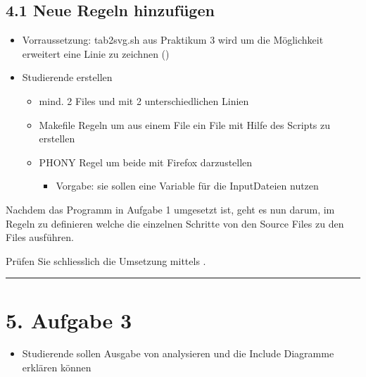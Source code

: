 \documentclass[a4paper,10pt,english]{report}
\begin{document}
\subsection{4.1 Neue Regeln hinzufügen}
\label{\detokenize{P04_Modularisieren_von_C_Code/new_P04/P04_Modularisieren_von_C_Code:neue-regeln-hinzufugen}}\begin{itemize}
\item {} 
\sphinxAtStartPar
Vorraussetzung: tab2svg.sh aus Praktikum 3 wird um die Möglichkeit erweitert eine Linie zu zeichnen ()

\item {} 
\sphinxAtStartPar
Studierende erstellen
\begin{itemize}
\item {} 
\sphinxAtStartPar
mind. 2 Files  und  mit 2 unterschiedlichen Linien

\item {} 
\sphinxAtStartPar
Makefile Regeln um aus einem File  ein File  mit Hilfe des Scripts zu erstellen

\item {} 
\sphinxAtStartPar
PHONY Regel  um beide  mit Firefox darzustellen
\begin{itemize}
\item {} 
\sphinxAtStartPar
Vorgabe: sie sollen eine Variable für die Input\sphinxhyphen{}Dateien nutzen

\end{itemize}

\end{itemize}

\end{itemize}

\sphinxAtStartPar
Nachdem das Programm in Aufgabe 1 umgesetzt ist, geht es nun darum, im  Regeln zu definieren welche die einzelnen Schritte von den Source Files zu den  Files ausführen.

\sphinxAtStartPar
Prüfen Sie schliesslich die Umsetzung mittels .


\bigskip\hrule\bigskip



\section{5. Aufgabe 3}
\label{\detokenize{P04_Modularisieren_von_C_Code/new_P04/P04_Modularisieren_von_C_Code:aufgabe-3}}\begin{itemize}
\item {} 
\sphinxAtStartPar
Studierende sollen Ausgabe von  analysieren und die Include Diagramme erklären können

\end{itemize}
\end{document}
